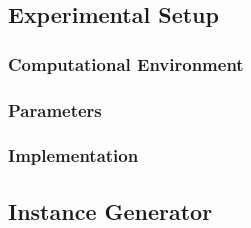 \subsection{Experimental Setup}
\subsubsection{Computational Environment}

\subsubsection{Parameters}

\subsubsection{Implementation}

\subsection{Instance Generator}

